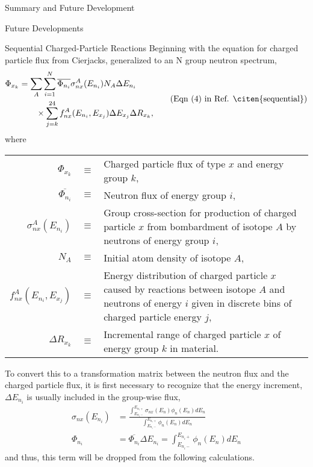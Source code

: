 \begin{chapter}{Summary and Future Development}
\begin{section}{Future Developments}
\begin{subsection}{Sequential Charged-Particle Reactions}
      Beginning with the equation for charged particle flux from
      Cierjacks, generalized to an N group neutron spectrum,
      \begin{equation}
        \begin{split}
          \Phi_{x_k} &= \sum_A \sum_{i=1}^N \overline{\Phi_{n_i}} \sigma_{nx}^A(E_{n_i}) N_A
          \Delta E_{n_i}\\
          &\quad\quad \times \sum_{j=k}^{24} f_{nx}^A(E_{n_i},E_{x_j}) \Delta
          E_{x_j} \Delta R_{x_k},
        \end{split}
        \tag{Eqn (4) in Ref. \citen{sequential}}
      \end{equation}
      where\\
      \begin{tabular}{rcp{12cm}}
        $\Phi_{x_k}$ & $\equiv$ & Charged particle flux of type $x$ and energy group
        $k$,\\
        $\overline{\Phi_{n_i}}$ & $\equiv$ & Neutron flux of energy group $i$,\\
        $\sigma_{nx}^A(E_{n_i})$ & $\equiv$ & Group cross-section for production of
        charged particle $x$ from bombardment of isotope $A$ by neutrons of
        energy group $i$,\\
        $N_A$ & $\equiv$ & Initial atom density of isotope $A$,\\
        $f_{nx}^A(E_{n_i},E_{x_j})$ & $\equiv$ & Energy distribution of charged
        particle $x$ caused by reactions between isotope $A$ and neutrons of
        energy $i$ given in discrete bins of charged particle energy $j$,\\
        $\Delta R_{x_k}$ & $\equiv$ & Incremental range of charged particle $x$ of
        energy group $k$ in material.
      \end{tabular}
      
      To convert this to a transformation matrix between the neutron
      flux and the charged particle flux, it is first necessary to
      recognize that the energy increment, $\Delta E_{n_i}$ is usually
      included in the group-wise flux,
      \begin{equation}
        \begin{split}
          \sigma_{nx}(E_{n_i}) &= \frac{\int_{E_{n_i-}}^{E_{n_i+}} \sigma_{nx}(E_n)
            \phi_n(E_n) dE_n}{\int_{E_{n_i-}}^{E_{n_i+}} \phi_n(E_n) dE_n}\\
          \Phi_{n_i} &= \overline{\Phi_{n_i}}\Delta E_{n_i} = \int_{E_{n_i-}}^{E_{n_i+}} \phi_n(E_n) dE_n
        \end{split}
      \end{equation}
      and thus, this term will be dropped from the following calculations.
      

\end{subsection}
\end{section}
\end{chapter}
